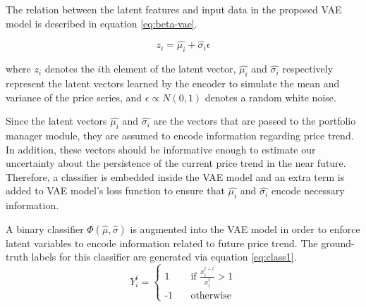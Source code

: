 The relation between the latent features and input data in the proposed VAE model is described in equation \eqref{eq:beta-vae}.

\begin{equation}
	z_i = \hat{\mu_i} + \hat{\sigma_i} \epsilon
	\label{eq:beta-vae}
\end{equation}

where $z_i$ denotes the $i$th element of the latent vector, $\hat{\mu_i}$ and $\hat{\sigma_i}$ respectively represent the latent vectors learned by the encoder to simulate the mean and variance of the price series, and $\epsilon \propto N(0, 1)$ denotes a random white noise.

Since the latent vectors $\hat{\mu_i}$ and $\hat{\sigma_i}$ are the vectors that are passed to the portfolio manager module, they are assumed to encode information regarding price trend. In addition, these vectors should be informative enough to estimate our uncertainty about the persistence of the current price trend in the near future. Therefore, a classifier is embedded inside the VAE model and an extra term is added to VAE model's loss function to ensure that $\hat{\mu_i}$ and $\hat{\sigma_i}$ encode necessary information.

A binary classifier $\Phi(\hat{\mu}, \hat{\sigma})$ is augmented into the VAE model in order to enforce latent variables to encode information related to future price trend. The ground-truth labels for this classifier are generated via equation \eqref{eq:class1}.
\begin{equation}
	Y_i^t = 
	\begin{cases}
	\text{1} &\quad\text{if } \frac{x_i^{t+l}}{x_i^t} > 1\\
	\text{-1} &\quad\text{otherwise}
	\end{cases}
	\label{eq:class1}
\end{equation}

